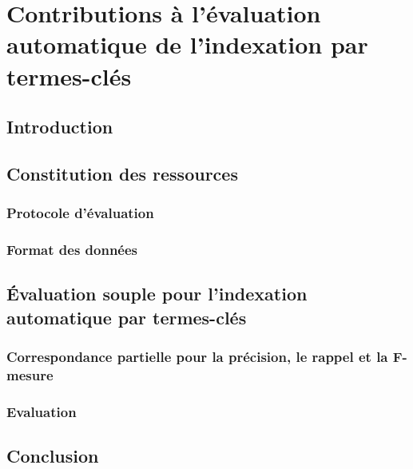 \chapter{Contributions à l'évaluation automatique de l'indexation par termes-clés}
\label{chap:main-automatic_evaluation_of_keyphrase_annotation}
  \section{Introduction}
  \label{sec:main-automatic_evaluation_of_keyphrase_annotation-introduction}


  \section{Constitution des ressources}
  \label{section:main-automatic_evaluation_of_keyphrase_annotation-resource_construction}
    \subsection{Protocole d'évaluation}
    \label{subsec:main-automatic_evaluation_of_keyphrase_annotation-resource_construction-evaluation_protocol}

    \subsection{Format des données}
    \label{subsec:main-automatic_evaluation_of_keyphrase_annotation-resource_construction-data_format}


  \section{Évaluation souple pour l'indexation automatique par termes-clés}
  \label{sec:main-automatic_evaluation_of_keyphrase_annotation-evaluation}
    \subsection{Correspondance partielle pour la précision, le rappel et la F-mesure}
    \label{subsec:main-automatic_evaluation_of_keyphrase_annotation-contributions-evaluation-soft_maching_precision_recall_and_f_measure}

    \subsection{Evaluation}
    \label{subsec:main-automatic_evaluation_of_keyphrase_annotation-contributions-evaluation-evaluation}


  \section{Conclusion}
  \label{sec:main-automatic_evaluation_of_keyphrase_annotation-Conclusion}

